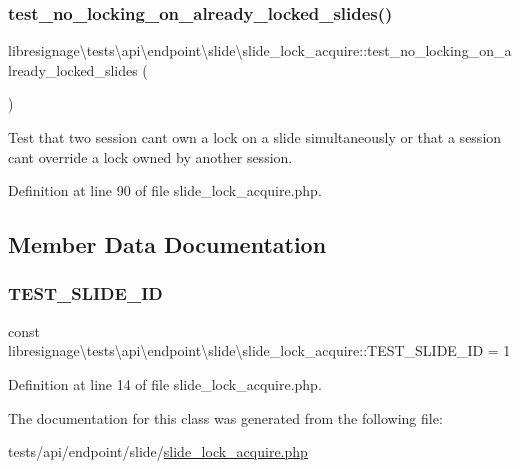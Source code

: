 \subsubsection{\texorpdfstring{test\+\_\+no\+\_\+locking\+\_\+on\+\_\+already\+\_\+locked\+\_\+slides()}{test\_no\_locking\_on\_already\_locked\_slides()}}
{\footnotesize\ttfamily libresignage\textbackslash{}tests\textbackslash{}api\textbackslash{}endpoint\textbackslash{}slide\textbackslash{}slide\+\_\+lock\+\_\+acquire\+::test\+\_\+no\+\_\+locking\+\_\+on\+\_\+already\+\_\+locked\+\_\+slides (\begin{DoxyParamCaption}{ }\end{DoxyParamCaption})}

Test that two session can\textquotesingle{}t own a lock on a slide simultaneously or that a session can\textquotesingle{}t override a lock owned by another session. 

Definition at line 90 of file slide\+\_\+lock\+\_\+acquire.\+php.



\subsection{Member Data Documentation}
\mbox{\label{classlibresignage_1_1tests_1_1api_1_1endpoint_1_1slide_1_1slide__lock__acquire_a1bc5291751722464978bcf870c54317c}} 
\subsubsection{\texorpdfstring{T\+E\+S\+T\+\_\+\+S\+L\+I\+D\+E\+\_\+\+ID}{TEST\_SLIDE\_ID}}
{\footnotesize\ttfamily const libresignage\textbackslash{}tests\textbackslash{}api\textbackslash{}endpoint\textbackslash{}slide\textbackslash{}slide\+\_\+lock\+\_\+acquire\+::\+T\+E\+S\+T\+\_\+\+S\+L\+I\+D\+E\+\_\+\+ID = \textquotesingle{}1\textquotesingle{}}



Definition at line 14 of file slide\+\_\+lock\+\_\+acquire.\+php.



The documentation for this class was generated from the following file\+:\begin{DoxyCompactItemize}
\item 
tests/api/endpoint/slide/\hyperlink{tests_2api_2endpoint_2slide_2slide__lock__acquire_8php}{slide\+\_\+lock\+\_\+acquire.\+php}\end{DoxyCompactItemize}
